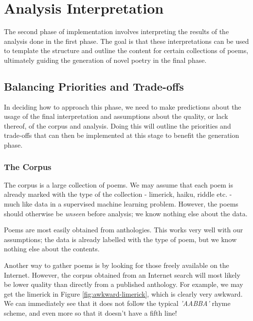 \chapter{Analysis Interpretation}
\ifpdf
    \graphicspath{{Implementation/ImplementationFigs/PNG/}{Implementation/ImplementationFigs/PDF/}{Implementation/ImplementationFigs/}}
\else
    \graphicspath{{Implementation/ImplementationFigs/EPS/}{Implementation/ImplementationFigs/}}
\fi

The second phase of implementation involves interpreting the results of the analysis done in the first phase. The goal is that these interpretations can be used to template the structure and outline the content for certain collections of poems, ultimately guiding the generation of novel poetry in the final phase.

\section{Balancing Priorities and Trade-offs}
\label{sec:balance-priorities}

In deciding how to approach this phase, we need to make predictions about the usage of the final interpretation and assumptions about the quality, or lack thereof, of the corpus and analysis. Doing this will outline the priorities and trade-offs that can then be implemented at this stage to benefit the generation phase.


\subsection{The Corpus}

The corpus is a large collection of poems. We may assume that each poem is already marked with the type of the collection - limerick, haiku, riddle etc. - much like data in a supervised machine learning problem. However, the poems should otherwise be \textit{unseen} before analysis; we know nothing else about the data. 

Poems are most easily obtained from anthologies. This works very well with our assumptions; the data is already labelled with the type of poem, but we know nothing else about the contents.

Another way to gather poems is by looking for those freely available on the Internet. However, the corpus obtained from an Internet search will most likely be lower quality than directly from a published anthology. For example, we may get the limerick in Figure \ref{fig:awkward-limerick}, which is clearly very awkward. We can immediately see that it does not follow the typical \textit{'AABBA'} rhyme scheme, and even more so that it doesn't have a fifth line!

